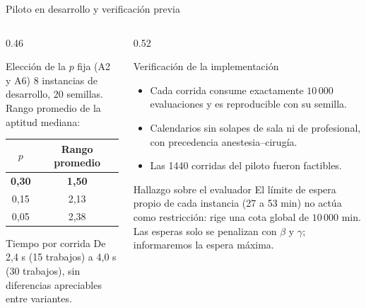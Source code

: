 \documentclass[aspectratio=169,11pt]{beamer}
\newcommand{\best}[1]{\textcolor{best}{\textbf{#1}}}
\begin{document}
\begin{frame}{Piloto en desarrollo y verificación previa}
  \begin{columns}[t]
    \begin{column}{0.46\textwidth}
      \begin{block}{Elección de la $p$ fija (A2 y A6)}
        \small
        8 instancias de desarrollo, 20 semillas. Rango promedio de la aptitud mediana:

        \vspace{0.15cm}
        \centering
        \begin{tabular}{cc}
          \toprule
          $p$ & \textbf{Rango promedio} \\
          \midrule
          \best{0,30} & \best{1,50} \\
          0,15 & 2,13 \\
          0,05 & 2,38 \\
          \bottomrule
        \end{tabular}
      \end{block}

      \begin{block}{Tiempo por corrida}
        \small
        De 2,4 s (15 trabajos) a 4,0 s (30 trabajos), sin diferencias apreciables entre variantes.
      \end{block}
    \end{column}

    \begin{column}{0.52\textwidth}
      \begin{exampleblock}{Verificación de la implementación}
        \footnotesize
        \begin{itemize}
          \item Cada corrida consume exactamente $10\,000$ evaluaciones y es reproducible con su semilla.
          \item Calendarios sin solapes de sala ni de profesional, con precedencia anestesia--cirugía.
          \item Las 1440 corridas del piloto fueron factibles.
        \end{itemize}
      \end{exampleblock}

      \begin{alertblock}{Hallazgo sobre el evaluador}
        \footnotesize
        El límite de espera propio de cada instancia (27 a 53 min) no actúa como restricción: rige una cota global de $10\,000$ min. Las esperas solo se penalizan con $\beta$ y $\gamma$; informaremos la espera máxima.
      \end{alertblock}
    \end{column}
  \end{columns}
\end{frame}
\end{document}
